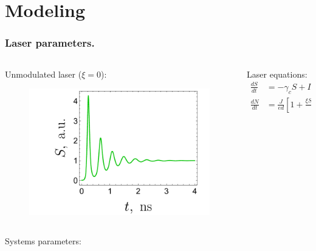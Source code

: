 \section{Modeling}

\begin{frame}
  \frametitle{Laser parameters.}
  \begin{columns}
    \begin{column}{.4\linewidth}
      Unmodulated laser ($\xi = 0$):
    \begin{figure}
        \centering
        \includegraphics[width=\linewidth]{figures/laser_classic.pdf}
    \end{figure}
    
    \end{column}
    \begin{column}{.6\linewidth}
      Laser equations:
      \begin{align*}
        \frac{d S}{d t}&=-\gamma_{c} S+\Gamma g S \\
        \frac{d N}{d t}&=\frac{J}{e d}\left[1+\frac{\xi S(t-\tau)}{S_{0}}\right]-\gamma_{s} N-g S
      \end{align*}
    \end{column}
  \end{columns}

  Systems parameters:
  \begin{itemize}
  \end{itemize}
  
\end{frame}

